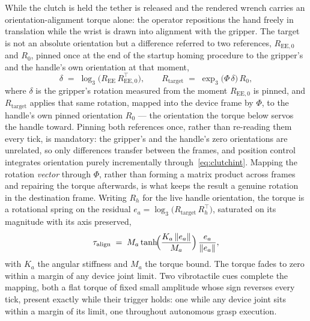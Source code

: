 While the clutch is held the tether is released and the rendered wrench carries an orientation-alignment torque alone: the operator repositions the hand freely in translation while the wrist is drawn into alignment with the gripper. The target is not an absolute orientation but a difference referred to two references, $R_{\text{EE},0}$ and $R_0$, pinned once at the end of the startup homing procedure to the gripper's and the handle's own orientation at that moment,
\begin{equation}
\delta \;=\; \log_3\!\bigl(R_{\text{EE}}\,R_{\text{EE},0}^{\top}\bigr),
\qquad
R_{\text{target}} \;=\; \exp_3\!\bigl(\Phi\,\delta\bigr)\, R_0,
\label{eq:clutchalign}
\end{equation}
where $\delta$ is the gripper's rotation measured from the moment $R_{\text{EE},0}$ is pinned, and $R_{\text{target}}$ applies that same rotation, mapped into the device frame by $\Phi$, to the handle's own pinned orientation $R_0$ --- the orientation the torque below servos the handle toward. Pinning both references once, rather than re-reading them every tick, is mandatory: the gripper's and the handle's zero orientations are unrelated, so only differences transfer between the frames, and position control integrates orientation purely incrementally through~\eqref{eq:clutchint}. Mapping the rotation \emph{vector} through $\Phi$, rather than forming a matrix product across frames and repairing the torque afterwards, is what keeps the result a genuine rotation in the destination frame. Writing $R_h$ for the live handle orientation, the torque is a rotational spring on the residual $e_a = \log_3\!\bigl(R_{\text{target}}\,R_h^{\top}\bigr)$, saturated on its magnitude with its axis preserved,
\begin{equation}
\tau_{\text{align}} \;=\; M_a \tanh\!\Bigl(\frac{K_a\,\| e_a \|}{M_a}\Bigr)\,\frac{e_a}{\| e_a \|},
\label{eq:aligntorque}
\end{equation}
with $K_a$ the angular stiffness and $M_a$ the torque bound. The torque fades to zero within a margin of any device joint limit. Two vibrotactile cues complete the mapping, both a flat torque of fixed small amplitude whose sign reverses every tick, present exactly while their trigger holds: one while any device joint sits within a margin of its limit, one throughout autonomous grasp execution.

